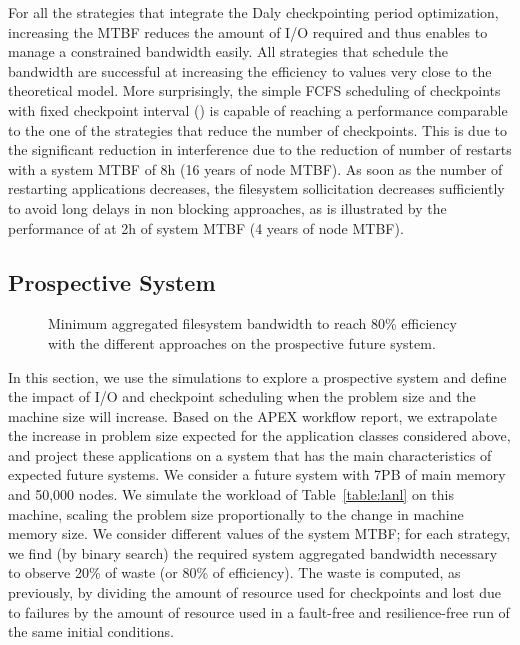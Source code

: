 For all the strategies that integrate the Daly checkpointing period
optimization, increasing the MTBF reduces the amount of I/O required
and thus enables to manage a constrained bandwidth easily. All
strategies that schedule the bandwidth are successful at increasing the
efficiency to values very close to the theoretical model. More
surprisingly, the simple FCFS scheduling of checkpoints with fixed
checkpoint interval (\bfifofixed) is capable of reaching a performance
comparable to the one of the strategies that reduce the number of
checkpoints. This is due to the significant reduction in interference
due to the reduction of number of restarts with a system MTBF of 8h
(16 years of node MTBF). As soon as the number of restarting
applications decreases, the filesystem sollicitation decreases
sufficiently to avoid long delays in non blocking approaches, as is
illustrated by the performance of \fifofixed at 2h of system MTBF (4
years of node MTBF).

\subsection{Prospective System}

\begin{figure}
  \begin{center}
    \resizebox{\linewidth}{!}{}
  \end{center}
  \caption{Minimum aggregated filesystem bandwidth to reach 80\%
    efficiency with the different approaches on the prospective
    future system.\label{fig:prosp}}
\end{figure}

In this section, we use the simulations to explore a prospective
system and define the impact of I/O and checkpoint scheduling when the
problem size and the machine size will increase. Based on the APEX
workflow report, we extrapolate the increase in problem size expected
for the application classes considered above, and project these
applications on a system that has the main characteristics of expected
future systems. We consider a future system with 7PB of main memory
and 50,000 nodes. We simulate the workload of Table~\ref{table:lanl}
on this machine, scaling the problem size proportionally to the
change in machine memory size. We consider different values of the
system MTBF; for each strategy, we find (by binary search) the
required system aggregated bandwidth necessary to observe 20\% of
waste (or 80\% of efficiency). The waste is computed, as previously,
by dividing the amount of resource used for checkpoints and lost due
to failures by the amount of resource used in a fault-free and
resilience-free run of the same initial conditions.

